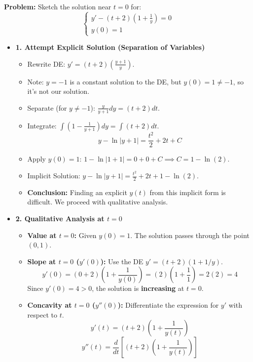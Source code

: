 \hfill

\begin{cascade}
	\textbf{Problem:} Sketch the solution near $t=0$ for:
	$$ \begin{cases} y' - (t+2)\left(1+\frac{1}{y}\right) = 0 \\ y(0) = 1 \end{cases} $$
	\begin{itemize}
		\item \textbf{1. Attempt Explicit Solution (Separation of Variables)}
		      \begin{itemize}
			      \item Rewrite DE: $y' = (t+2)\left(\frac{y+1}{y}\right)$.
			      \item Note: $y=-1$ is a constant solution to the DE, but $y(0)=1 \neq -1$, so it's not our solution.
			      \item Separate (for $y \neq -1$): $\frac{y}{y+1} dy = (t+2) dt$.
			      \item Integrate: $\int \left(1 - \frac{1}{y+1}\right) dy = \int (t+2) dt$.
			            $$ y - \ln|y+1| = \frac{t^2}{2} + 2t + C $$
			      \item Apply $y(0)=1$: $1 - \ln|1+1| = 0 + 0 + C \implies C = 1 - \ln(2)$.
			      \item Implicit Solution: $y - \ln|y+1| = \frac{t^2}{2} + 2t + 1 - \ln(2)$.
			      \item \textbf{Conclusion:} Finding an explicit $y(t)$ from this implicit form is difficult. We proceed with qualitative analysis.
		      \end{itemize}
		\item \textbf{2. Qualitative Analysis at $t=0$}
		      \begin{itemize}
			      \item \textbf{Value at $t=0$:} Given $y(0) = 1$. The solution passes through the point $(0, 1)$.
			      \item \textbf{Slope at $t=0$ ($y'(0)$):} Use the DE $y' = (t+2)(1 + 1/y)$.
			            $$ y'(0) = (0+2)\left(1 + \frac{1}{y(0)}\right) = (2)\left(1 + \frac{1}{1}\right) = 2(2) = 4 $$
			            Since $y'(0) = 4 > 0$, the solution is \textbf{increasing} at $t=0$.
			      \item \textbf{Concavity at $t=0$ ($y''(0)$):} Differentiate the expression for $y'$ with respect to $t$.
			            $$ y'(t) = (t+2)\left(1 + \frac{1}{y(t)}\right) $$
			            $$ y''(t) = \frac{d}{dt} \left[ (t+2)\left(1 + \frac{1}{y(t)}\right) \right] $$

\end{itemize}
\end{itemize}
\end{cascade}

